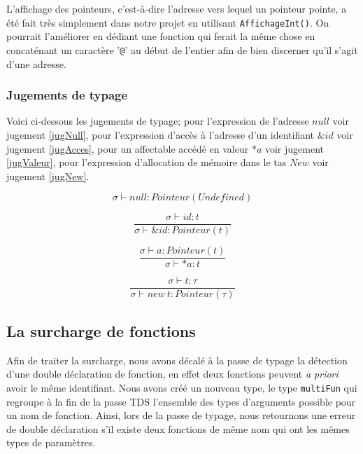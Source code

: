 \documentclass[11pt,a4paper]{article}
\begin{document}
L'affichage des pointeurs, c'est-à-dire l'adresse vers lequel un pointeur pointe, a été fait très simplement dans notre projet en utilisant \texttt{AffichageInt()}. On pourrait l'améliorer en dédiant une fonction qui ferait la même chose en concaténant un caractère '\texttt{@}' au début de l'entier afin de bien discerner qu'il s'agit d'une adresse.

\subsubsection*{Jugements de typage}

Voici ci-dessous les jugements de typage; pour l'expression de l'adresse $null$ voir jugement \ref{jugNull}, pour l'expression d'accès à l'adresse d'un identifiant $\&id$ voir jugement \ref{jugAcces}, pour un affectable accédé en valeur $*a$ voir jugement \ref{jugValeur}, pour l'expression d'allocation de mémoire dans le tas $New$ voir jugement \ref{jugNew}.

\begin{equation}
	\label{jugNull}
	\sigma \vdash null : Pointeur(Undefined)
\end{equation}

\begin{equation}
	\label{jugAcces}
	\frac{\sigma \vdash id : t}{\sigma \vdash \& id : Pointeur(t)}
\end{equation}

\begin{equation}
	\label{jugValeur}
	\frac{\sigma \vdash a : Pointeur(t)}{\sigma \vdash *a : t}
\end{equation}

\begin{equation}
	\label{jugNew}
	\frac{\sigma \vdash t : \tau}{\sigma \vdash new \  t : Pointeur(\tau)}
\end{equation}

\subsection{La surcharge de fonctions}

Afin de traiter la surcharge, nous avons décalé à la passe de typage la détection d'une double déclaration de fonction, en effet deux fonctions peuvent \emph{a priori} avoir le même identifiant. Nous avons créé un nouveau type, le type \texttt{multiFun} qui regroupe à la fin de la passe TDS l'ensemble des types d'arguments possible pour un nom de fonction. Ainsi, lors de la passe de typage, nous retournons une erreur de double déclaration s’il existe deux fonctions de même nom qui ont les mêmes types de paramètres. 
\end{document}

